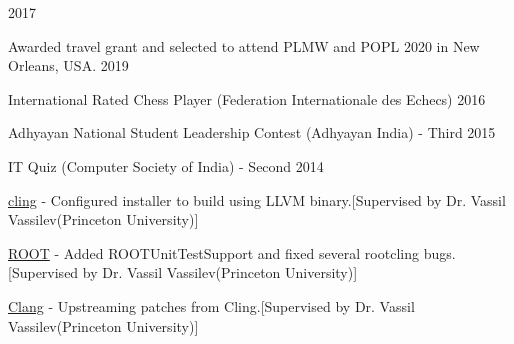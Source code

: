\documentclass[10pt, letterpaper]{fulldeps}
\begin{document}
\hfill{2017}\\
\vspace{-15pt}
\pagebreak

%
%

%
%
\begin{tightitemize}
    \item Awarded travel grant and selected to attend PLMW and POPL 2020 in New Orleans, USA. \hfill{2019}
    \item International Rated Chess Player (Federation Internationale des Echecs) \hfill{2016}
    \item Adhyayan National Student Leadership Contest (Adhyayan India) - Third \hfill{2015}
    \item IT Quiz (Computer Society of India) - Second \hfill{2014}
\end{tightitemize}

\begin{tightitemize}
\item {\href{https://github.com/root-project/cling}{cling}} - Configured installer to build using LLVM binary.[Supervised by Dr. Vassil Vassilev(Princeton University)]
\item {\href{https://github.com/root-project/root}{ROOT}} - Added ROOTUnitTestSupport and fixed several rootcling bugs.[Supervised by Dr. Vassil Vassilev(Princeton University)]
\item {\href{https://clang.llvm.org/}{Clang}} - Upstreaming patches from Cling.[Supervised by Dr. Vassil Vassilev(Princeton University)]
\end{tightitemize}
\end{document}
